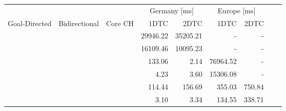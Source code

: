 \begin{tabular}{cccrrrrrr}
	\toprule
	              &               &         & \multicolumn{2}{c}{Germany [\si{\milli\second}]} & \multicolumn{2}{c}{Europe [\si{\milli\second}]}               \\
	Goal-Directed & Bidirectional & Core CH & 1DTC                                             & 2DTC                                            & 1DTC & 2DTC \\
	\midrule
	\xmark        & \xmark        & \xmark  & 29946.22                                                & 35205.21                                               & -    & -    \\
	\xmark        & \cmark        & \xmark  & 16109.46                                                & 10095.23                                               & -    & -    \\
	\cmark        & \xmark        & \xmark  & 133.06                                                & 2.14                                               & 76964.52    & -    \\
	\cmark        & \cmark        & \xmark  & 4.23                                                & 3.60                                               & 15306.08    & -    \\
	\xmark        & \cmark        & \cmark  & 114.44                                                & 156.69                                               & 355.03    & 750.84    \\
	\cmark        & \cmark        & \cmark  & 3.10                                                & 3.34                                               & 134.55    & 338.71    \\
	\bottomrule
\end{tabular}